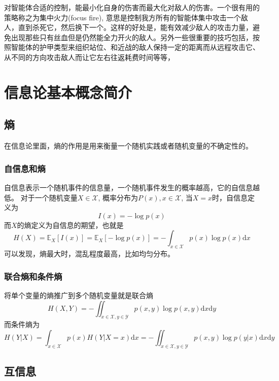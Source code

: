 对智能体合适的控制，能最小化自身的伤害而最大化对敌人的伤害。一个很有用的策略称之为集中火力(focus fire), 意思是控制我方所有的智能体集中攻击一个敌人，直到杀死它，然后换下一个。这样的好处是，能有效减少敌人的攻击力量，避免出现那些只有丝血但是仍然能全力开火的敌人。另外一些很重要的技巧包括，按照智能体的护甲类型来组织站位、和近战的敌人保持一定的距离而从远程攻击它、从不同的方向攻击敌人而让它左右往返耗费时间等等，

\section{信息论基本概念简介}
\subsection{熵}
在信息论里面，熵的作用是用来衡量一个随机实践或者随机变量的不确定性的。

\subsubsection{自信息和熵}
自信息表示一个随机事件的信息量，一个随机事件发生的概率越高，它的自信息越低。
对于一个随机变量$X\in \mathcal{X}$, 概率分布为$P(x),x\in\mathcal{X}$, 当$X=x$时，自信息定义为
\begin{equation}
    I(x) = -\log p(x)
\end{equation}
而$X$的熵定义为自信息的期望，也就是
\begin{equation}
    H(X) = \mathbb{E}_X[I(x)] = \mathbb{E}_X[-\log p(x)]=-\int_{x\in\mathcal{X}}p(x)\log p(x)\mathrm{d}x
\end{equation}
可以发现，熵最大时，混乱程度最高，比如均匀分布。

\subsubsection{联合熵和条件熵}
将单个变量的熵推广到多个随机变量就是联合熵
\begin{equation}
    H(X,Y) = -\iint_{x\in\mathcal{X},y\in\mathcal{Y}}p(x,y)\log p(x,y)\mathrm{d}x\mathrm{d}y
\end{equation}
而条件熵为
\begin{equation}
    H(Y|X)=\int_{x\in\mathcal{X}}p(x)H(Y|X=x)\mathrm{d}x=-\iint_{x\in\mathcal{X},y\in\mathcal{Y}}p(x,y)\log p(y|x)\mathrm{d}x\mathrm{d}y
\end{equation}

\subsection{互信息}
